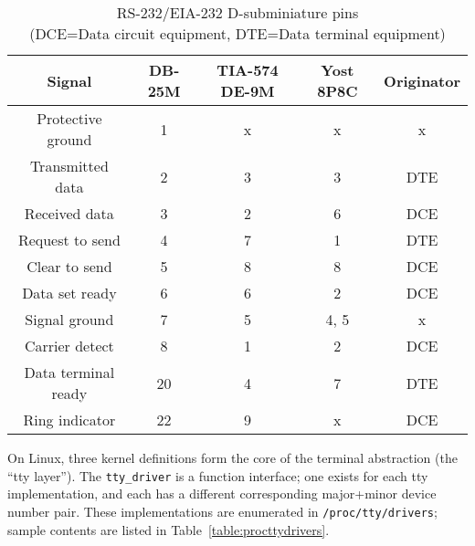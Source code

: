 \begin{table}
  \centering
  \begin{tabular}{ |c|c|c|c|c| }
    \hline
    Signal & DB-25M & TIA-574 DE-9M & Yost 8P8C\cite{yost} & Originator \\
    \hline
    \hline
    Protective ground & 1 & x & x & x \\
    \hline
    Transmitted data & 2 & 3 & 3 & DTE \\
    \hline
    Received data & 3 & 2 & 6 & DCE \\
    \hline
    Request to send & 4 & 7 & 1 & DTE \\
    \hline
    Clear to send & 5 & 8 & 8 & DCE \\
    \hline
    Data set ready & 6 & 6 & 2 & DCE \\
    \hline
    Signal ground & 7 & 5 & 4, 5 & x \\
    \hline
    Carrier detect & 8 & 1 & 2 & DCE \\
    \hline
    Data terminal ready & 20 & 4 & 7 & DTE \\
    \hline
    Ring indicator & 22 & 9 & x & DCE \\
    \hline
  \end{tabular}
  \caption[RS-232/EIA-232 pin mappings]{RS-232/EIA-232 D-subminiature pins\\
    (DCE=Data circuit equipment, DTE=Data terminal equipment)}
  \label{table:serial}
\end{table}

On Linux, three kernel definitions form the core of the terminal abstraction
(the ``tty layer''). The \texttt{tty\_driver} is a function interface; one
exists for each tty implementation, and each has a different corresponding
major+minor device number pair. These implementations are enumerated in
\texttt{/proc/tty/drivers}; sample contents are listed in Table~\ref{table:procttydrivers}.

